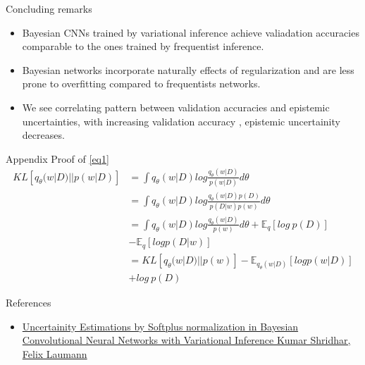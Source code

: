 \documentclass{beamer}
\theoremstyle{remark}
\begin{document}
\begin{frame}{Concluding remarks}
    \begin{itemize}
        \item Bayesian CNNs trained by variational inference achieve valiadation accuracies comparable to the ones trained by frequentist inference. 
        \item Bayesian networks incorporate naturally effects of regularization and are less prone to overfitting compared to frequentists networks.
        \item We see correlating pattern between validation accuracies and epistemic uncertainties, with increasing validation accuracy , epistemic uncertainity decreases.
    \end{itemize}
\end{frame}
\begin{frame}{Appendix}
    Proof of \eqref{eq1}
    \begin{align*}
            KL [q_\theta(w|D) || p(w|D)] &= \int q_\theta(w|D) log \frac{q_\theta(w|D)}{p(w|D)} d\theta \\
            &= \int q_\theta(w|D) log \frac{q_\theta(w|D) p(D)}{p(D|w)p(w)} d\theta\\
            &= \int q_\theta(w|D) log \frac{q_\theta(w|D)}{p(w)} d\theta + \mathbb{E}_q[log \:p(D)]\\
            &- \mathbb{E}_q[log p(D|w)]\\
            &= KL [q_\theta(w|D) || p(w)] - \mathbb{E}_{q_\theta(w|D)} [log p(w|D)]\\
            &+log\:p(D)
    \end{align*}
\end{frame}
\begin{frame}{References}
    \begin{itemize}
        \item \href{https://arxiv.org/pdf/1806.05978v6.pdf}{Uncertainity Estimations by Softplus normalization in Bayesian Convolutional Neural Networks with Variational Inference Kumar Shridhar, Felix Laumann}
    \end{itemize}
\end{frame}
\end{document}

